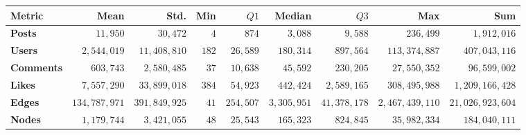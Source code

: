 \begin{tabular}{lrrrrrrrr}
\toprule
\textbf{Metric} &          Mean &          Std. &   Min &      $Q1$ &      Median &         $Q3$ &             Max &              Sum \\
\midrule
\textbf{Posts   } &      $11,950$ &      $30,472$ &   $4$ &     $874$ &     $3,088$ &      $9,588$ &       $236,499$ &      $1,912,016$ \\
\textbf{Users   } &   $2,544,019$ &  $11,408,810$ & $182$ &  $26,589$ &   $180,314$ &    $897,564$ &   $113,374,887$ &    $407,043,116$ \\
\textbf{Comments} &     $603,743$ &   $2,580,485$ &  $37$ &  $10,638$ &    $45,592$ &    $230,205$ &    $27,550,352$ &     $96,599,002$ \\
\textbf{Likes   } &   $7,557,290$ &  $33,899,018$ & $384$ &  $54,923$ &   $442,424$ &  $2,589,165$ &   $308,495,988$ &  $1,209,166,428$ \\
\textbf{Edges   } & $134,787,971$ & $391,849,925$ &  $41$ & $254,507$ & $3,305,951$ & $41,378,178$ & $2,467,439,110$ & $21,026,923,604$ \\
\textbf{Nodes   } &   $1,179,744$ &   $3,421,055$ &  $48$ &  $25,543$ &   $165,323$ &    $824,845$ &    $35,982,334$ &    $184,040,111$ \\
\bottomrule
\end{tabular}
